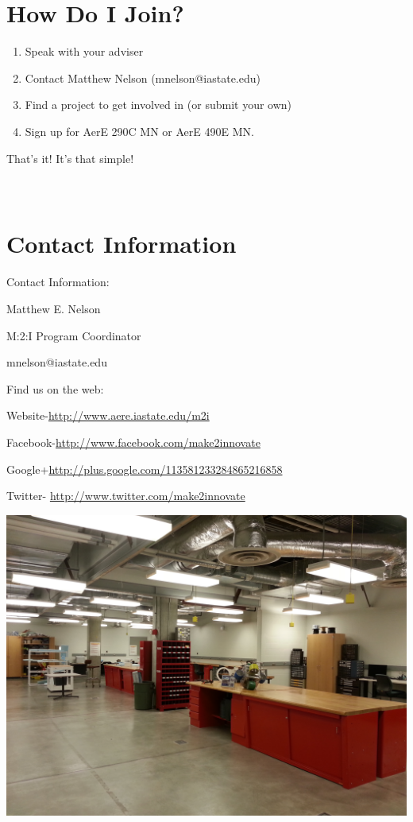 \documentclass[10pt,foldmark,notumble]{leaflet}
\begin{document}
\section{How Do I Join?}

\begin{enumerate}
\item Speak with your adviser
\item Contact Matthew Nelson (mnelson@iastate.edu)
\item Find a project to get involved in (or submit your own)
\item Sign up for AerE 290C MN or AerE 490E MN.
\end{enumerate}

That's it!  It's that simple!
\ \\ \ \\ \ \\
\section{Contact Information}

\begin{center}
Contact Information:

Matthew E. Nelson

M:2:I Program Coordinator

mnelson@iastate.edu

\end{center}

Find us on the web:

Website-\url{http://www.aere.iastate.edu/m2i}

Facebook-\url{http://www.facebook.com/make2innovate}

Google+\url{http://plus.google.com/113581233284865216858}

Twitter- \url{http://www.twitter.com/make2innovate}

\includegraphics[scale=.07]{images/0620_lab.jpg}
\end{document}
